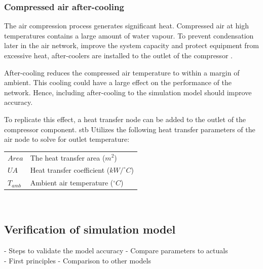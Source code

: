 		\subsubsection{Compressed air after-cooling}
		The air compression process generates significant heat. Compressed air at high temperatures contains a large amount of water vapour. To prevent condensation later in the air network, improve the system capacity and protect equipment from excessive heat, after-coolers are installed to the outlet of the compressor \cite{schroeder2009energy}.
		\par 
		After-cooling reduces the compressed air temperature to within a margin of ambient. This cooling could have a large effect on the performance of the network. Hence, including after-cooling to the simulation model should improve accuracy.
		\par 
		To replicate this effect, a heat transfer node can be added to the outlet of the compressor component. \gls{stb} Utilizes the following heat transfer parameters of the air node to solve for outlet temperature: 
		\begin{tabular}{p{1.3cm}p{13cm}}
			$Area$ & The heat transfer area ($m^2$) \\
			$UA$ & Heat transfer coefficient ($kW/^{\circ} C$) \\
			$T_{amb}$ & Ambient air temperature ($^{\circ} C$) \\
		\end{tabular} \\	
	\subsection{Verification of simulation model}
		- Steps to validate  the model accuracy - Compare parameters to actuals\\
		- First principles     - Comparison to other models
		
